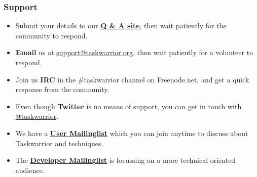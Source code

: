 \documentclass[t,handout,aspectratio=169]{beamer}
\begin{document}
\begin{frame}[fragile]\frametitle{Support}
    \vfill
    \vfill
    \begin{itemize}
        \item Submit your details to our \href{https://answers.tasktools.org}{\textbf{Q \& A site}}, then wait patiently for the community to respond.
        \item \textbf{Email} us at \href{mailto:support@taskwarrior.org}{support@taskwarrior.org}, then wait patiently for a volunteer to respond.
        \item Join us \textbf{IRC} in the \#taskwarrior channel on Freenode.net, and get a quick response from the community.
        \item Even though \textbf{Twitter} is no means of support, you can get in touch with \href{https://twitter.com/taskwarrior}{@taskwarrior}.
        \item We have a \href{https://groups.google.com/forum/\#!forum/taskwarrior-user}{\textbf{User Mailinglist}} which you can join anytime to discuss about Taskwarrior and techniques.
        \item The \href{https://groups.google.com/forum/\#!forum/taskwarrior-dev}{\textbf{Developer Mailinglist}} is focussing on a more technical oriented audience.
    \end{itemize}
\end{frame}
\end{document}
